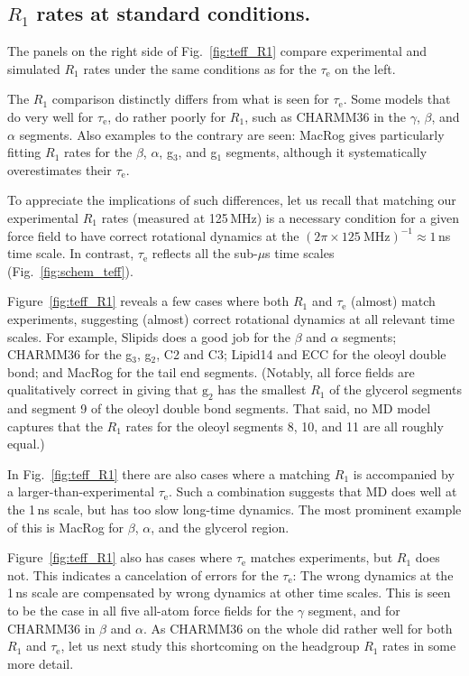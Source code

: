 \documentclass[journal=jpcbfk,manuscript=article,layout=twocolumn]{achemso}
\begin{document}
\subsection*{$R_1$ rates at standard conditions.}
The panels on the right side of Fig.~\ref{fig:teff_R1} compare experimental and simulated $R_{1}$ rates under the same conditions as for the $\tau_\mathrm{e}$ on the left.

The $R_1$ comparison distinctly differs from what is seen for $\tau_\mathrm{e}$.
Some models that do very well for $\tau_\mathrm{e}$, do rather poorly for $R_1$, such as CHARMM36 in the $\gamma$, $\beta$, and $\alpha$ segments.
Also examples to the contrary are seen: MacRog gives particularly fitting $R_{1}$ rates for the $\beta$, $\alpha$, g$_3$, and g$_1$ segments, although it systematically overestimates their $\tau_\mathrm{e}$.

To appreciate the implications of such differences, let us recall that
matching our experimental $R_1$ rates (measured at 125\,MHz)
is a necessary condition for a given force field to have correct rotational dynamics at the $(2\pi\times125~\mathrm{MHz})^{-1}\approx1$\,ns time scale.
In contrast, $\tau_\mathrm{e}$ reflects all the sub-$\mu$s time scales (Fig.~\ref{fig:schem_teff}).

Figure~\ref{fig:teff_R1} reveals a few cases where both $R_1$ and $\tau_\mathrm{e}$ (almost) match experiments, suggesting (almost) correct rotational dynamics at all relevant time scales.
%
%
For example, 
Slipids does a good job for the $\beta$ and $\alpha$ segments;
CHARMM36 for the g$_3$, g$_2$,  C2 and C3;
Lipid14 and ECC for the oleoyl double bond; and
MacRog for the tail end segments.
%
(Notably,
all force fields are qualitatively correct in giving that $\mathrm g_2$ has the smallest $R_1$ of the glycerol segments and segment 9 of the oleoyl double bond segments. That said, no MD model captures that the $R_1$ rates for the oleoyl segments 8, 10, and 11 are all roughly equal.)

In Fig.~\ref{fig:teff_R1} there are also cases where a matching $R_1$ is accompanied by a larger-than-experimental $\tau_\mathrm{e}$. Such a combination suggests that MD does well at the 1\,ns scale, but has too slow long-time dynamics.
%
The most prominent example of this is MacRog for $\beta$, $\alpha$, and the glycerol region.

Figure~\ref{fig:teff_R1} also has cases where $\tau_\mathrm{e}$ matches experiments, but $R_1$ does not. This indicates a cancelation of errors for the $\tau_\mathrm{e}$: The wrong dynamics at the 1\,ns scale are compensated by wrong dynamics at other time scales.
%
This is seen to be the case in all five all-atom force fields for the $\gamma$ segment,
and for CHARMM36 in $\beta$ and $\alpha$.
%
As CHARMM36 on the whole did rather well for both $R_1$ and $\tau_\mathrm{e}$,
let us next study this shortcoming on the headgroup $R_1$ rates
in some more detail.
%
\end{document}
